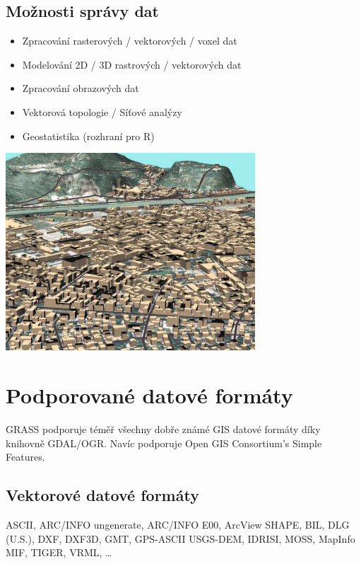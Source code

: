 \documentclass[notumble,a4paper,10pt,nofoldmark]{leaflet}
\newenvironment{myfig}[1][0pt plus 1.5ex minus .5ex]{\par\vspace*{#1}\begin{minipage}{\textwidth}\centering}{\end{minipage}}
\begin{document}
\subsection{Možnosti správy dat}

\begin{itemize}
\item Zpracování rasterových / vektorových / voxel dat
\item Modelování 2D / 3D rastrových / vektorových dat
\item Zpracování obrazových dat
\item Vektorová topologie / Síťové analýzy
\item Geostatistika (rozhraní pro R)
\end{itemize}

\begin{myfig}[1ex]
\includegraphics[width=0.7\textwidth]{trento3d}
\end{myfig}

\section{Podporované datové formáty}

GRASS podporuje téměř všechny dobře známé GIS datové formáty díky knihovně GDAL/OGR. Navíc podporuje Open GIS Consortium's Simple Features.

\subsection{Vektorové datové formáty}
ASCII, ARC/INFO ungenerate, ARC/INFO E00, Arc\-View SHAPE, BIL, DLG (U.S.), DXF, DXF3D, GMT, GPS-ASCII USGS-DEM, IDRISI, MOSS, MapInfo MIF, TIGER, VRML, \dots
\end{document}
